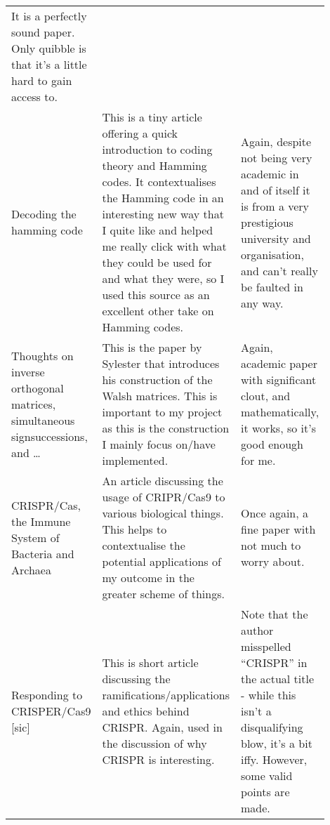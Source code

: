 \documentclass[a4paper,11pt]{article}
\begin{document}
\begin{center}
{\begin{longtable}{p{0.2\linewidth} p{0.35\linewidth} p{0.35\linewidth}}
    It is a perfectly sound paper. Only quibble is that it's a little hard to
    gain access to.

    \\

    Decoding the hamming code \cite{DecodingHamming2006Eherenborg} &

    This is a tiny article offering a quick introduction to coding theory and
    Hamming codes. It contextualises the Hamming code in an interesting new way
    that I quite like and helped me really click with what they could be used
    for and what they were, so I used this source as an excellent other take on
    Hamming codes. &

    Again, despite not being very academic in and of itself it is from a very
    prestigious university and organisation, and can't really be faulted in any
    way.

    \\

    Thoughts on inverse orthogonal matrices, simultaneous
    signsuccessions, and \ldots \cite{OrthogonalMatrix1867Sylvester} &

    This is the paper by Sylester that introduces his construction of the Walsh
    matrices. This is important to my project as this is the construction I
    mainly focus on/have implemented. &

    Again, academic paper with significant clout, and mathematically, it works,
    so it's good enough for me. \\

    CRISPR/Cas, the Immune System of Bacteria and Archaea
    \cite{CRISPRImmune2010Horvath} &

    An article discussing the usage of CRIPR/Cas9 to various biological things.
    This helps to contextualise the potential applications of my outcome in the
    greater scheme of things. &

    Once again, a fine paper with not much to worry about. \\

    Responding to {CRISPER}\-/\-Cas9 [sic] \cite{CRISPER2016Finneran} &

    This is short article discussing the ramifications/applications and ethics
    behind CRISPR. Again, used in the discussion of why CRISPR is interesting. &

    Note that the author misspelled ``CRISPR'' in the actual title - while this
    isn't a disqualifying blow, it's a bit iffy. However, some valid points are
    made. \\


\end{longtable}}
\end{center}
\end{document}

